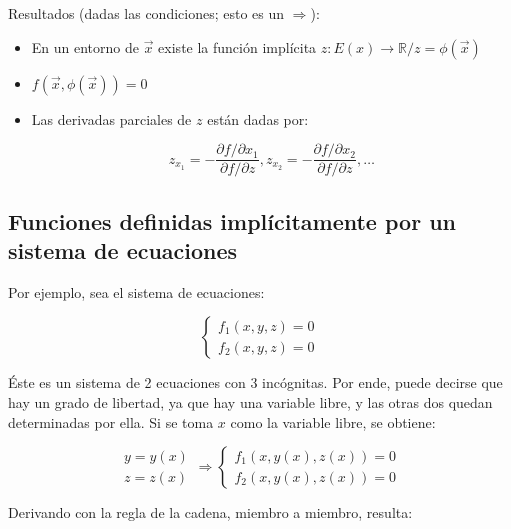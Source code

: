 \documentclass{article}
\renewcommand{\Bbb}{\mathbb}
\begin{document}
Resultados (dadas las condiciones; esto es un $\Rightarrow$):

\begin{itemize}
\item En un entorno de $\overrightarrow{x}$ existe la función implícita $z:E(x) \rightarrow \Bbb R / z = \phi(\overrightarrow{x})$
\item $f(\overrightarrow{x}, \phi(\overrightarrow{x})) = 0$
\item Las derivadas parciales de $z$ están dadas por:

\begin{equation}
z_{x_1} = -\frac{\partial f / \partial x_1}{\partial f / \partial z}, z_{x_2} = -\frac{\partial f / \partial x_2}{\partial f / \partial z}, \ldots
\end{equation}
\end{itemize}



\subsection{Funciones definidas implícitamente por un sistema de ecuaciones}

Por ejemplo, sea el sistema de ecuaciones:

\begin{equation}
\left\{
\begin{array}{ll}
f_1(x, y, z) = 0 \\
f_2(x, y, z) = 0
\end{array}
\right.
\end{equation}

Éste es un sistema de 2 ecuaciones con 3 incógnitas. Por ende, puede decirse que hay un grado de libertad, ya que hay una variable libre, y las otras dos quedan determinadas por ella. Si se toma $x$ como la variable libre, se obtiene:

\begin{equation}
\begin{array}{ll}
y = y(x) \\
z = z(x)
\end{array} \Rightarrow
\left\{
\begin{array}{ll}
f_1(x, y(x), z(x)) = 0 \\
f_2(x, y(x), z(x)) = 0
\end{array}
\right.
\end{equation}

Derivando con la regla de la cadena, miembro a miembro, resulta:
\end{document}
